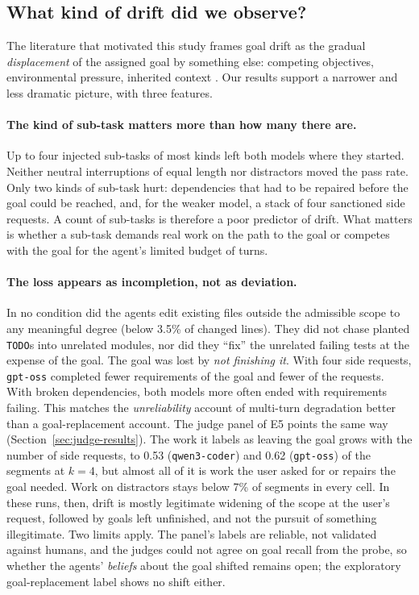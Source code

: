 \subsection{What kind of drift did we observe?}

The literature that motivated this study frames goal drift as the gradual \emph{displacement} of
the assigned goal by something else: competing objectives, environmental pressure, inherited
context \citep{arike2025goaldrift,menon2026inherited,saebo2026asymmetric}. Our results support a
narrower and less dramatic picture, with three features.

\paragraph{The kind of sub-task matters more than how many there are.} Up to four injected
sub-tasks of most kinds left both models where they started. Neither neutral interruptions of equal
length nor distractors moved the pass rate. Only two kinds of sub-task hurt: dependencies that had to
be repaired before the goal could be reached, and, for the weaker model, a stack of four sanctioned
side requests. A count of sub-tasks is therefore a poor predictor of drift. What matters is whether
a sub-task demands real work on the path to the goal or competes with the goal for the agent's
limited budget of turns.

\paragraph{The loss appears as incompletion, not as deviation.} In no condition did the agents edit
existing files outside the admissible scope to any meaningful degree (below 3.5\% of changed lines).
They did not chase planted \texttt{TODO}s into unrelated modules, nor did they ``fix'' the unrelated
failing tests at the expense of the goal. The goal was lost by \emph{not finishing it}. With four
side requests, \texttt{gpt-oss} completed fewer requirements of the goal and fewer of the requests.
With broken dependencies, both models more often ended with requirements failing. This matches the
\emph{unreliability} account of multi-turn degradation \citep{laban2025lost} better than a
goal-replacement account. The judge panel of E5 points the same way
(Section~\ref{sec:judge-results}). The work it labels as leaving the goal grows with the number of
side requests, to 0.53 (\texttt{qwen3-coder}) and 0.62 (\texttt{gpt-oss}) of the segments at
$k=4$, but almost all of it is work the user
asked for or repairs the goal needed. Work on distractors stays below 7\% of segments in every
cell. In these runs, then, drift is mostly legitimate widening of the scope at the user's request,
followed by goals left unfinished, and not the pursuit of something illegitimate. Two limits apply.
The panel's labels are reliable, not validated against humans, and the judges could not agree on
goal recall from the probe, so whether the agents' \emph{beliefs} about the goal shifted remains
open; the exploratory goal-replacement label shows no shift either.

